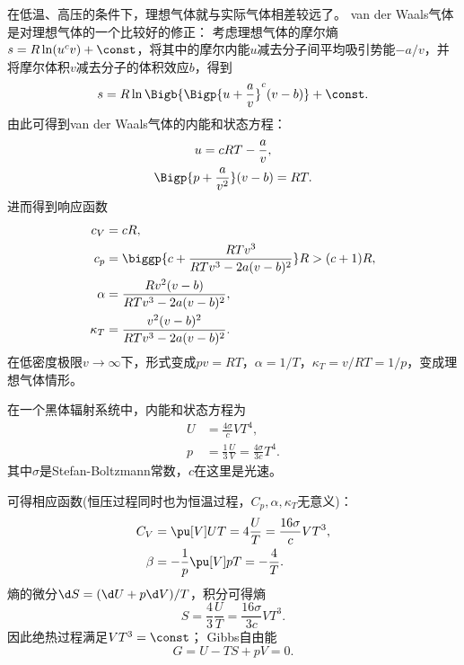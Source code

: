 在低温、高压的条件下，理想气体就与实际气体相差较远了。
van der Waals气体是对理想气体的一个比较好的修正：
考虑理想气体的摩尔熵$s=R\ln(u^cv)+\const$，将其中的摩尔内能$u$减去分子间平均吸引势能$-a/v$，并将摩尔体积$v$减去分子的体积效应$b$，得到
\begin{equation}
	s=R\ln\Bigb{\Bigp{u+\frac av}^c(v-b)}+\const.
\end{equation}
由此可得到van der Waals气体的内能和状态方程：
\begin{subequations}
	\begin{gather}
		u=cRT-\frac av,\\
		\Bigp{p+\frac a{v^2}}(v-b)=RT.
	\end{gather}
\end{subequations}
进而得到响应函数
\begin{subequations}
	\begin{align}
		c_V&=cR,\\
		c_p&=\biggp{c+\frac{RTv^3}{RTv^3-2a(v-b)^2}}R>(c+1)R,\\
		\alpha&=\frac{Rv^2(v-b)}{RTv^3-2a(v-b)^2},\\
		\kappa_T&=\frac{v^2(v-b)^2}{RTv^3-2a(v-b)^2}.
	\end{align}
\end{subequations}
在低密度极限$v\to\infty$下，形式变成$pv=RT$，$\alpha=1/T$，$\kappa_T=v/RT=1/p$，变成理想气体情形。


在一个黑体辐射系统中，内能和状态方程为
\begin{subequations}
	\begin{align}
		U&=\frac{4\sigma}cVT^4,\\
		p&=\frac13\frac UV=\frac{4\sigma}{3c}T^4.
	\end{align}
\end{subequations}
其中$\sigma$是Stefan-Boltzmann常数，$c$在这里是光速。

可得相应函数(恒压过程同时也为恒温过程，$C_p,\alpha,\kappa_T$无意义)：
\begin{subequations}
	\begin{align}
		C_V&=\pu[V]UT=4\frac UT=\frac{16\sigma}cVT^3,\\
		\beta&=-\frac1p\pu[V]pT=-\frac4T.
	\end{align}
\end{subequations}
熵的微分$\d S=(\d U+p\d V)/T$，积分可得熵
\begin{equation}
	S=\frac43\frac UT=\frac{16\sigma}{3c}VT^3.
\end{equation}
因此绝热过程满足$VT^3=\const$；
Gibbs自由能
\begin{equation}
	G=U-TS+pV=0.
\end{equation}

